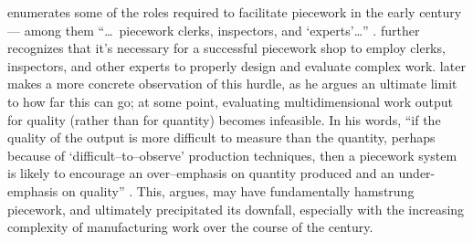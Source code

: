 \documentclass[trackingWork]{subfiles}
\begin{document}
\citeauthor{10.2307/23702539} enumerates some of the roles required
to facilitate piecework in the early  century --- among them
    ``\dots~piecework clerks, inspectors, and `experts'\dots''
\cite{10.2307/23702539}.
\citeauthor{10.2307/23702539} further recognizes that
it's necessary for a successful piecework shop to employ
clerks,
inspectors, and
other experts to properly design and evaluate complex work.
\citeauthor{hart2016rise} later makes a more concrete observation of this hurdle,
as he argues an ultimate limit to how far this can go;
at some point, evaluating multidimensional work output for quality
(rather than for quantity) becomes infeasible.
In his words,
``if the quality of the output is more difficult to measure than the quantity,
perhaps because of `difficult--to--observe' production techniques,
then a piecework system is likely to encourage
an over--emphasis on quantity produced and an under-emphasis on quality''
\cite{hart2016rise}.
This, \citeauthor{hart2016rise} argues, may have fundamentally hamstrung piecework,
and ultimately precipitated its downfall,
especially with the increasing complexity of manufacturing work
over the course of the  century.
\end{document}
